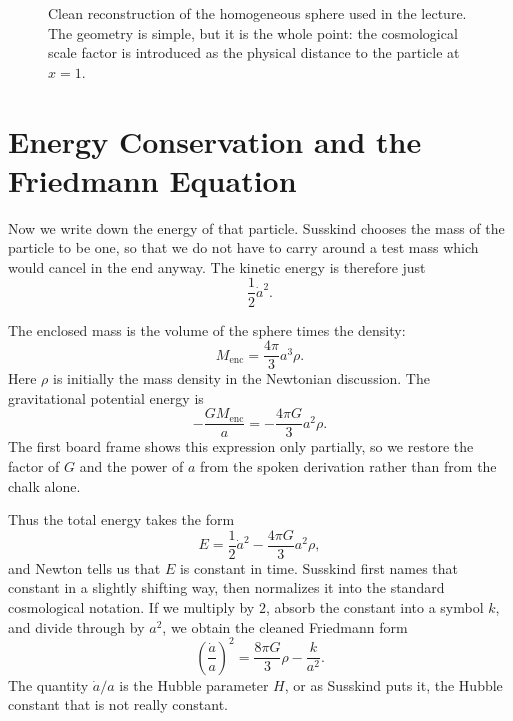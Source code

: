 \begin{figure}[ht]
\centering
{}
\caption{Clean reconstruction of the homogeneous sphere used in the lecture. The geometry is simple, but it is the whole point: the cosmological scale factor is introduced as the physical distance to the particle at \(x=1\).}
\end{figure}

\section{Energy Conservation and the Friedmann Equation}

Now we write down the energy of that particle. Susskind chooses the mass of the particle to be one, so that we do not have to carry around a test mass which would cancel in the end anyway. The kinetic energy is therefore just
\begin{equation}
\frac{1}{2}\dot a^2.
\end{equation}

The enclosed mass is the volume of the sphere times the density:
\begin{equation}
M_{\mathrm{enc}}=\frac{4\pi}{3}a^3\rho.
\end{equation}
Here \(\rho\) is initially the mass density in the Newtonian discussion. The gravitational potential energy is
\begin{equation}
-\frac{G M_{\mathrm{enc}}}{a}
=
-\frac{4\pi G}{3}a^2\rho.
\end{equation}
The first board frame shows this expression only partially, so we restore the factor of \(G\) and the power of \(a\) from the spoken derivation rather than from the chalk alone.

Thus the total energy takes the form
\begin{equation}
E=\frac{1}{2}\dot a^2-\frac{4\pi G}{3}a^2\rho,
\end{equation}
and Newton tells us that \(E\) is constant in time. Susskind first names that constant in a slightly shifting way, then normalizes it into the standard cosmological notation. If we multiply by \(2\), absorb the constant into a symbol \(k\), and divide through by \(a^2\), we obtain the cleaned Friedmann form
\begin{equation}
\left(\frac{\dot a}{a}\right)^2=\frac{8\pi G}{3}\rho-\frac{k}{a^2}.
\end{equation}
The quantity \(\dot a/a\) is the Hubble parameter \(H\), or as Susskind puts it, the Hubble constant that is not really constant.

